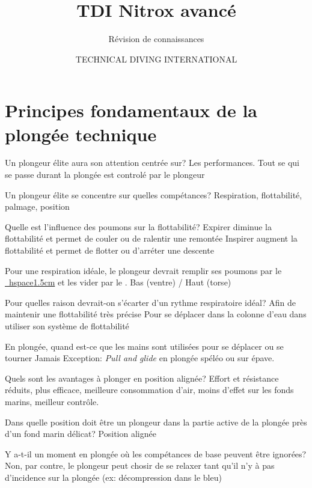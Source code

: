 \documentclass[english,12pt,a4paper]{article}
\title{TDI Nitrox avancé}
\subtitle{Révision de connaissances}
\author{TECHNICAL DIVING INTERNATIONAL}
\begin{document}
	

	\setcounter{section}{1}
	\section{Principes fondamentaux de la plongée technique}

	\begin{outline}
		\1 Un plongeur élite aura son attention centrée sur?
			\2[-] Les performances. Tout se qui se passe durant la plongée est controlé par le plongeur
	
		\1 Un plongeur élite se concentre sur quelles compétances?
			\2[-] Respiration, flottabilité, palmage, position
	
		\1 Quelle est l'influence des poumons sur la flottabilité?
			\2[-] Expirer diminue la flottabilité et permet de couler ou de ralentir une remontée
			\2[-] Inspirer augment la flottabilité et permet de flotter ou d'arréter une descente
	
		\1 Pour une respiration idéale, le plongeur devrait remplir ses poumons par le \underline{	} et les vider par le \underline{\hspace{1.5cm}}.
			\2[-] Bas (ventre) / Haut (torse)
	
		\1 Pour quelles raison devrait-on s'écarter d'un rythme respiratoire idéal?
			\2[-] Afin de maintenir une flottabilité très précise
			\2[-] Pour se déplacer dans la colonne d'eau dans utiliser son système de flottabilité
	
		\1 En plongée, quand est-ce que les mains sont utilisées pour se déplacer ou se tourner
			\2[-] Jamais
			\2[-] Exception: \textit{Pull and glide} en plongée spéléo ou sur épave.
	
		\1 Quels sont les avantages à plonger en position alignée?
			\2[-] Effort et résistance réduits, plus efficace, meilleure consommation d'air, moins 	d'effet sur les fonds marins, meilleur contrôle.
	
		\1 Dans quelle position doit être un plongeur dans la partie active de la plongée près 	d'un 	fond marin délicat?
			\2[-] Position alignée
	
		\1 Y a-t-il un moment en plongée où les compétances de base peuvent être ignorées?
			\2[-] Non, par contre, le plongeur peut chosir de se relaxer tant qu'il n'y à pas 	d'incidence sur la plongée (ex: décompression dans le bleu)
	\end{outline}
	\pagebreak
\end{document}
